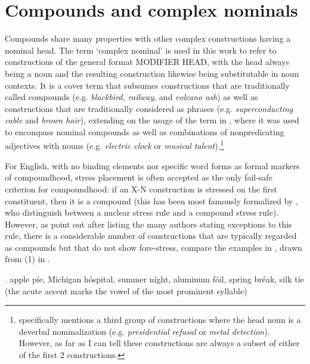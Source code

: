 \section{Compounds and complex nominals}
\label{sec:intro-complex-nominals}

Compounds share many properties with other complex constructions
having a nominal head. The term `complex nominal' is used in this work
to refer to
constructions of the general format MODIFIER HEAD, with the head always being a
noun and the resulting construction likewise being substitutable in noun contexts. It is a cover term that subsumes constructions that are traditionally called
compounds (e.g. \emph{blackbird, railway}, and \emph{volcano ash}) as well as constructions
that are traditionally considered as phrases (e.g.
\emph{superconducting cable} and \emph{brown hair}), extending on the
usage of the term in \citet[1--2]{Levi:1978}, where it was used to encompass
nominal compounds as well as combinations of nonpredicating adjectives
with nouns (e.g.  \emph{electric clock} or \emph{musical
  talent}).\footnote{\citet[1--2]{Levi:1978} specifically mentions a
  third group of constructions where the head noun is a deverbal nominalization (e.g.
\emph{presidential refusal} or \emph{metal detection}). However, as far
as I can tell these constructions are always a subset of either of the first 2 constructions.}

For English, with no binding elements nor specific word forms as formal
markers of compoundhood, stress placement is often accepted as the
only fail-safe criterion for compoundhood: if an X-N construction is
stressed on the first constituent, then it is a compound (this
has been most famously formalized by \citealt[17--18]{ChomskyandHalle:1968}, who
distinguish between a nuclear stress rule and a compound stress
rule). However, as
\citet[761]{Plagetal:2008} point out after listing the many authors
stating exceptions to this rule, there is a considerable number of constructions that
are typically regarded as compounds but that do not show fore-stress,
compare the examples in \Next, drawn from (1) in
\citet{Plagetal:2008}.

\ex. apple p\'ie, Michigan h\'ospital, summer n\'ight, aluminum f\'oil,
spring br\'eak, silk t\'ie\\
(the acute accent marks the vowel of the
most prominent syllable)

